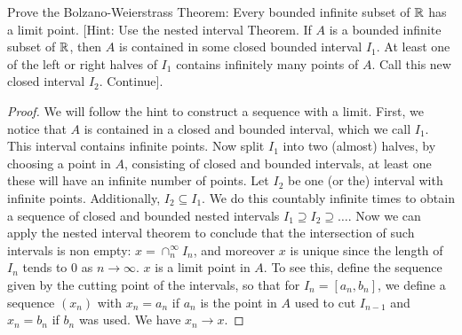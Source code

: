 \begin{exercise}{37}
Prove the Bolzano-Weierstrass Theorem:
Every bounded infinite subset of $\mathbb{R}$ has a limit point.
[Hint: Use the nested interval Theorem.
If $A$ is a bounded infinite subset of $\mathbb{R}$, then $A$ is contained in some closed bounded interval $I_1$.
At least one of the left or right halves of $I_1$ contains infinitely many points of $A$.
Call this new closed interval $I_2$.
Continue].
\end{exercise}
\begin{proof}
We will follow the hint to construct a sequence with a limit.
First, we notice that $A$ is contained in a closed and bounded interval, which we call $I_1$.
This interval contains infinite points.
Now split $I_1$ into two (almost) halves, by choosing a point in $A$, consisting of closed and bounded intervals, at least one these will have an infinite number of points.
Let $I_2$ be one (or the) interval with infinite points.
Additionally, $I_2\subseteq I_1$.
We do this countably infinite times to obtain a sequence of closed and bounded nested intervals $I_1\supseteq I_2\supseteq \dots$.
Now we can apply the nested interval theorem to conclude that the intersection of such intervals is non empty: $x=\cap_n^\infty I_n$, and moreover $x$ is unique since the length of $I_n$ tends to 0 as $n\to\infty$.
$x$ is a limit point in $A$.
To see this, define the sequence given by the cutting point of the intervals, so that for $I_n=[a_n,b_n]$, we define a sequence $(x_n)$ with $x_n=a_n$ if $a_n$ is the point in $A$ used to cut $I_{n-1}$ and $x_n=b_n$ if $b_n$ was used. 
We have $x_n\to x$.
\end{proof} 

